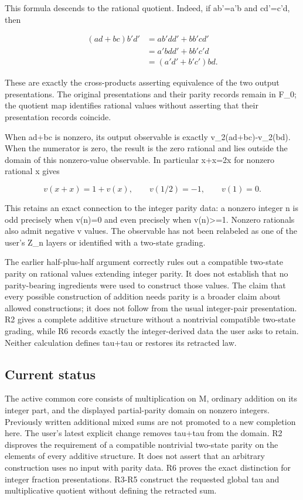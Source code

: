 \documentclass[
]{article}
\begin{document}
This formula descends to the rational quotient. Indeed, if ab'=a'b and
cd'=c'd, then

\[
\begin{aligned}
(ad+bc)b'd'
&=ab'dd'+bb'cd'\\
&=a'bdd'+bb'c'd\\
&=(a'd'+b'c')bd.
\end{aligned}
\tag{R6.3a}
\]

These are exactly the cross-products asserting equivalence of the two
output presentations. The original presentations and their parity
records remain in F\_0; the quotient map identifies rational values
without asserting that their presentation records coincide.

When ad+bc is nonzero, its output observable is exactly
v\_2(ad+bc)-v\_2(bd). When the numerator is zero, the result is the zero
rational and lies outside the domain of this nonzero-value observable.
In particular x+x=2x for nonzero rational x gives

\[
v(x+x)=1+v(x),\qquad
v(1/2)=-1,\qquad v(1)=0.
\tag{R6.4}
\]

This retains an exact connection to the integer parity data: a nonzero
integer n is odd precisely when v(n)=0 and even precisely when
v(n)\textgreater=1. Nonzero rationals also admit negative v values. The
observable has not been relabeled as one of the user's Z\_n layers or
identified with a two-state grading.

The earlier half-plus-half argument correctly rules out a compatible
two-state parity on rational values extending integer parity. It does
not establish that no parity-bearing ingredients were used to construct
those values. The claim that every possible construction of addition
needs parity is a broader claim about allowed constructions; it does not
follow from the usual integer-pair presentation. R2 gives a complete
additive structure without a nontrivial compatible two-state grading,
while R6 records exactly the integer-derived data the user asks to
retain. Neither calculation defines tau+tau or restores its retracted
law.

\subsection{Current status}\label{current-status}

The active common core consists of multiplication on M, ordinary
addition on its integer part, and the displayed partial-parity domain on
nonzero integers. Previously written additional mixed sums are not
promoted to a new completion here. The user's latest explicit change
removes tau+tau from the domain. R2 disproves the requirement of a
compatible nontrivial two-state parity on the elements of every additive
structure. It does not assert that an arbitrary construction uses no
input with parity data. R6 proves the exact distinction for integer
fraction presentations. R3-R5 construct the requested global tau and
multiplicative quotient without defining the retracted sum.
\end{document}

